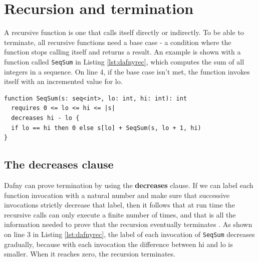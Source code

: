 \documentclass[a4paper]{article}
\begin{document}
\section{Recursion and termination}
A recursive function is one that calls itself directly or indirectly. To be able to terminate, all recursive
functions need a base case - a condition where the function stops calling itself and returns a result. An example
is shown with a function called \texttt{SeqSum} in Listing \ref{lst:dafnyrec}, which computes the sum of all
integers in a sequence. On line 4, if the base case isn't met, the function invokes itself with an incremented value for lo.
\begin{lstlisting}[style=dafnystyle, caption={Function computing the sum of all integers in a sequence recursively.}, label={lst:dafnyrec}]
function SeqSum(s: seq<int>, lo: int, hi: int): int
  requires 0 <= lo <= hi <= |s|
  decreases hi - lo {
  if lo == hi then 0 else s[lo] + SeqSum(s, lo + 1, hi)
}
\end{lstlisting}
\subsection{The decreases clause}
Dafny can prove termination by using the \textbf{decreases} clause. If we can label each function invocation with
a natural number and make sure that successive invocations strictly decrease that label, then it follows
that at run time the recursive calls can only execute a finite number of times, and that is all the information
needed to prove that the recursion eventually terminates \cite{Herbert2012}. As shown on line 3 in Listing
\ref{lst:dafnyrec}, the label of each invocation of \texttt{SeqSum} decreases gradually, because with each invocation
the difference between hi and lo is smaller. When it reaches zero, the recursion terminates.
\end{document}
